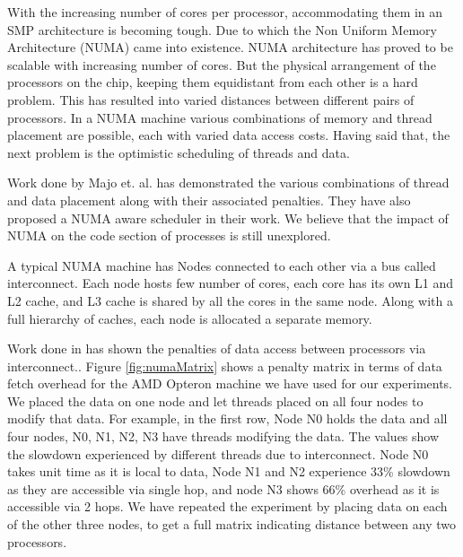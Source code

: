 With the increasing number of cores per processor, accommodating them in an SMP architecture is becoming tough.
Due to which the Non Uniform Memory Architecture (NUMA) came into existence.
NUMA architecture has proved to be scalable with increasing number of cores.
But the physical arrangement of the processors on the chip, keeping them equidistant from each other is a hard problem.
This has resulted into varied distances between different pairs of processors.
In a NUMA machine various combinations of memory and thread placement are possible, each with varied data access costs.
Having said that, the next problem is the optimistic scheduling of threads and data.

Work done by Majo et. al. \cite{Majo:2011:MMN:1993478.1993481} has demonstrated the various combinations of thread and data placement along with their associated penalties.
They have also proposed a NUMA aware scheduler in their work.
We believe that the impact of NUMA on the code section of processes is still unexplored.

A typical NUMA machine has Nodes connected to each other via a bus called interconnect.
Each node hosts few number of cores, each core has its own L1 and L2 cache, and L3 cache is shared by all the cores in the same node.
Along with a full hierarchy of caches, each node is allocated a separate memory.

Work done in \cite{Drepper07whatevery} has shown the penalties of data access between processors via interconnect..
Figure \ref{fig:numaMatrix} shows a penalty matrix in terms of data fetch overhead for the AMD Opteron machine we have used for our experiments.
We placed the data on one node and let threads placed on all four nodes to modify that data.
For example, in the first row, Node N0 holds the data and all four nodes, N0, N1, N2, N3 have threads modifying the data.
The values show the slowdown experienced by different threads due to interconnect.
Node N0 takes unit time as it is local to data, Node N1 and N2 experience 33\% slowdown as they are accessible via single hop, and node N3 shows 66\% overhead as it is accessible via 2 hops.
We have repeated the experiment by placing data on each of the other three nodes, to get a full matrix indicating distance between any two processors.


